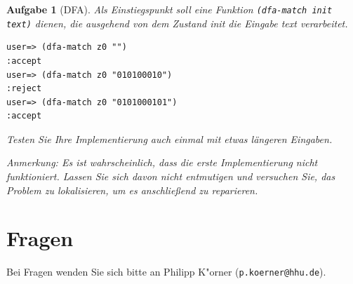 \documentclass[11pt,a4paper]{article}
\newcounter{numb}
\theoremstyle{break}
\newtheorem{aufgabe}{Aufgabe}[numb]
\begin{document}
\begin{aufgabe}[DFA]
Als Einstiegspunkt soll eine Funktion \verb|(dfa-match init text)| dienen, die ausgehend von dem Zustand init die Eingabe text verarbeitet.

\begin{verbatim}
user=> (dfa-match z0 "")
:accept
user=> (dfa-match z0 "010100010")
:reject
user=> (dfa-match z0 "0101000101")
:accept
\end{verbatim}


Testen Sie Ihre Implementierung auch einmal mit etwas l\"angeren Eingaben.

Anmerkung: Es ist wahrscheinlich, dass die erste Implementierung nicht funktioniert.
Lassen Sie sich davon nicht entmutigen und versuchen Sie, das Problem zu lokalisieren,
um es anschlie\ss{}end zu reparieren.

\end{aufgabe}


\section*{Fragen}
Bei Fragen wenden Sie sich bitte an Philipp K"orner (\texttt{p.koerner@hhu.de}).
\end{document}

